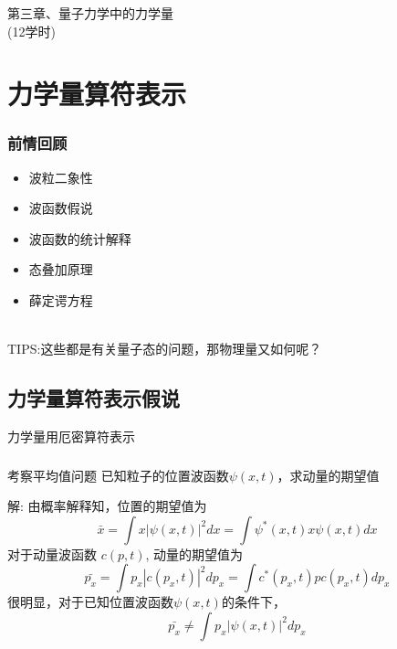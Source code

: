 \begin{frame} [plain]
    \frametitle{}
    \Background[1] 
    \begin{center}
    { {\huge 第三章、量子力学中的力学量 \\ (12学时)}}
    \end{center}  
    \addtocounter{framenumber}{-1}   
\end{frame}

\section{力学量算符表示}

\begin{frame}
    \frametitle{前情回顾}
    \begin{itemize}
        \item 波粒二象性
        \item 波函数假说
        \item 波函数的统计解释
        \item 态叠加原理
        \item 薛定谔方程
    \end{itemize}
    ~~\\ \vspace{1.0em}
    \hspace{2em}\alert{TIPS:}这些都是有关量子态的问题，那物理量又如何呢？
\end{frame} 

\subsection{力学量算符表示假说}

\begin{frame}    
    \begin{tcolorbox4}
    力学量用厄密算符表示
    \end{tcolorbox4}
\end{frame} 

\begin{frame} 
    \frametitle{}
    \begin{exampleblock}{考察平均值问题}
        已知粒子的位置波函数$\psi(x,t)$，求动量的期望值   
    \end{exampleblock}
    \alert{解:} 由概率解释知，位置的期望值为
    \begin{equation*}
        \bar{x}=\int x|\psi(x, t)|^{2} d x=\int \psi^{*}(x, t) x \psi(x, t) d x
    \end{equation*}
    对于动量波函数 $c(p,t)$, 动量的期望值为
    \begin{equation*}
        \bar{p_x}=\int p_x|c(p_x, t)|^{2} d p_x=\int c^{*}(p_x, t) p c(p_x, t) d p_x
    \end{equation*}
    很明显，对于已知位置波函数$\psi(x,t)$的条件下，
    \begin{equation*}
        \bar{p_x}\neq\int p_x|\psi(x, t)|^{2} d p_x
    \end{equation*}
\end{frame} 

